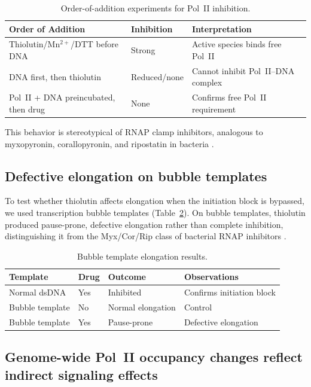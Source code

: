 \documentclass[11pt,a4paper]{article}
\begin{document}
\begin{table}[htbp]
\centering
\caption{Order-of-addition experiments for Pol~II inhibition.}
\label{tab:order}
\begin{tabular}{lll}
\toprule
\textbf{Order of Addition} & \textbf{Inhibition} & \textbf{Interpretation} \\
\midrule
Thiolutin/Mn$^{2+}$/DTT before DNA & Strong & Active species binds free Pol~II \\
DNA first, then thiolutin & Reduced/none & Cannot inhibit Pol~II--DNA complex \\
Pol~II + DNA preincubated, then drug & None & Confirms free Pol~II requirement \\
\bottomrule
\end{tabular}
\end{table}

This behavior is stereotypical of RNAP clamp inhibitors, analogous to myxopyronin, corallopyronin, and ripostatin in bacteria \citep{Mukhopadhyay2008, Srivastava2011, Maffioli2017}.

\subsection{Defective elongation on bubble templates}

To test whether thiolutin affects elongation when the initiation block is bypassed, we used transcription bubble templates (Table~\ref{tab:bubble}). On bubble templates, thiolutin produced pause-prone, defective elongation rather than complete inhibition, distinguishing it from the Myx/Cor/Rip class of bacterial RNAP inhibitors \citep{Mukhopadhyay2008}.

\begin{table}[htbp]
\centering
\caption{Bubble template elongation results.}
\label{tab:bubble}
\begin{tabular}{llll}
\toprule
\textbf{Template} & \textbf{Drug} & \textbf{Outcome} & \textbf{Observations} \\
\midrule
Normal dsDNA & Yes & Inhibited & Confirms initiation block \\
Bubble template & No & Normal elongation & Control \\
Bubble template & Yes & Pause-prone & Defective elongation \\
\bottomrule
\end{tabular}
\end{table}

\subsection{Genome-wide Pol~II occupancy changes reflect indirect signaling effects}
\end{document}
